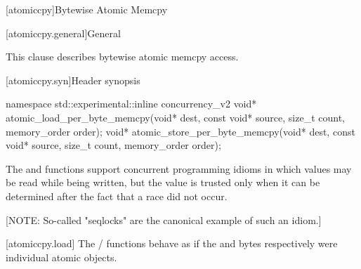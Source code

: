 
[atomiccpy]{Bytewise Atomic Memcpy}

[atomiccpy.general]{General}

This clause describes bytewise atomic memcpy access. 


[atomiccpy.syn]{Header  synopsis}

\begin{codeblock}
namespace std::experimental::inline concurrency_v2 {
  void* atomic_load_per_byte_memcpy(void* dest, const void* source, size_t count, memory_order order);
  void* atomic_store_per_byte_memcpy(void* dest, const void* source, size_t count, memory_order order);
}
\end{codeblock}

\pnum

The  and
 functions support concurrent
programming idioms in which values may be read while being written, but
the value is trusted only when it can be determined after the fact that
a race did not occur.

[NOTE: So-called "seqlocks" are the canonical
example of such an idiom.]%


[atomiccpy.load]{}
\pnum
The  /
 functions behave as if the
 and  bytes respectively were individual
atomic objects.

\textbf{}

